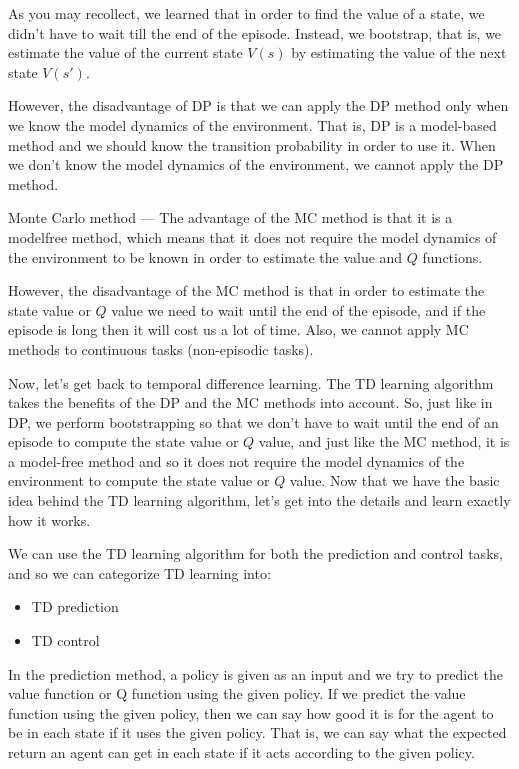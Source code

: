 As you may recollect, we learned that in order to find the value of a state, 
we didn't have to wait till the end of the episode. Instead, we bootstrap, 
that is, we estimate the value of the current state $V(s)$ by estimating the 
value of the next state $V(s')$. 

However, the disadvantage of DP is that we can apply the DP method only when 
we know the model dynamics of the environment. That is, DP is a model-based 
method and we should know the transition probability in order to use it. 
When we don't know the model dynamics of the environment, we cannot apply 
the DP method.  

Monte Carlo method — The advantage of the MC method is that it is a 
modelfree method, which means that it does not require the model dynamics 
of the environment to be known in order to estimate the value and $Q$ 
functions.  

However, the disadvantage of the MC method is that in order to estimate the 
state value or $Q$ value we need to wait until the end of the episode, and 
if the episode is long then it will cost us a lot of time. Also, we cannot 
apply MC methods to continuous tasks (non-episodic tasks).  

Now, let's get back to temporal difference learning. The TD learning 
algorithm takes the benefits of the DP and the MC methods into account. So, 
just like in DP, we perform bootstrapping so that we don't have to wait 
until the end of an episode to compute the state value or $Q$ value, and 
just like the MC method, it is a model-free method and so it does not 
require the model dynamics of the environment to compute the state value 
or $Q$ value. Now that we have the basic idea behind the TD learning 
algorithm, let's get into the details and learn exactly how it works. 

We can use the TD learning algorithm for both the prediction and control 
tasks, and so we can categorize TD learning into:  
\begin{itemize}
\item
TD prediction

\item
TD control
\end{itemize}

In the prediction method, a policy is given as an input and we try to 
predict the value function or Q function using the given policy. If we 
predict the value function using the given policy, then we can say how good 
it is for the agent to be in each state if it uses the given policy. That 
is, we can say what the expected return an agent can get in each state if 
it acts according to the given policy.  

